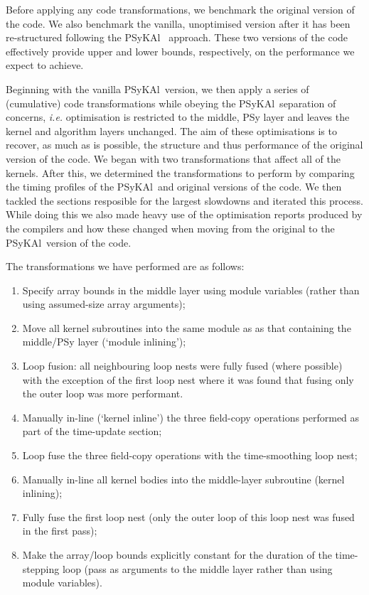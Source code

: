 \documentclass{IOS-Book-Article}
\newcommand{\psykal}{{PS}y{KA}l\ }
\begin{document}
Before applying any code transformations, we benchmark the original
version of the code. We also benchmark the vanilla, unoptimised
version after it has been re-structured following the \psykal
approach. These two versions of the code effectively provide upper and
lower bounds, respectively, on the performance we expect to achieve.

Beginning with the vanilla \psykal version, we then apply a series of
(cumulative) code transformations while obeying the \psykal separation
of concerns, {\it i.e.} optimisation is restricted to the middle,
{PS}y layer and leaves the kernel and algorithm layers unchanged. The
aim of these optimisations is to recover, as much as is possible, the
structure and thus performance of the original version of the code. We
began with two transformations that affect all of the kernels. After
this, we determined the transformations to perform by comparing the
timing profiles of the \psykal and original versions of the code. We
then tackled the sections resposible for the largest slowdowns and
iterated this process. While doing this we also made heavy use of the
optimisation reports produced by the compilers and how these changed
when moving from the original to the \psykal version of the code.

The transformations we have performed are as follows:
\begin{enumerate}

\item Specify array bounds in the middle layer using module variables
  (rather than using assumed-size array arguments);

\item Move all kernel subroutines into the same module as as that
  containing the middle/PSy layer (`module inlining');

\item Loop fusion: all neighbouring loop nests were fully fused (where
  possible) with the exception of the first loop nest where it was
  found that fusing only the outer loop was more performant.

\item Manually in-line (`kernel inline') the three field-copy operations
  performed as part of the time-update section;

\item Loop fuse the three field-copy operations with the
  time-smoothing loop nest;

\item Manually in-line all kernel bodies into the middle-layer
  subroutine (kernel inlining);

\item Fully fuse the first loop nest (only the outer loop of this loop
  nest was fused in the first pass);

\item Make the array/loop bounds explicitly constant for the duration
  of the time-stepping loop (pass as arguments to the middle layer
  rather than using module variables).

\end{enumerate}
\end{document}
